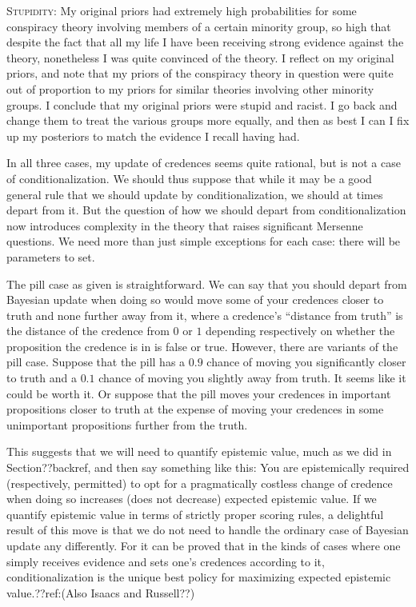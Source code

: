 \textsc{Stupidity:} My original priors had extremely high probabilities for some conspiracy theory involving members of a certain 
minority group, so high that despite the fact that all my life I have been receiving strong evidence against the theory, nonetheless I 
was quite convinced of the theory. I reflect on my original priors, and note that my priors of the conspiracy theory in question were 
quite out of proportion to my priors for similar theories involving other minority groups. I conclude that my original priors were
stupid and racist. I go back and change them to treat the various groups more equally, and then as best I can I fix up my posteriors
to match the evidence I recall having had. 

In all three cases, my update of credences seems quite rational, but is not a case of conditionalization. We should thus
suppose that while it may be a good general rule that we should update by conditionalization, we should at times depart from it.
But the question of how we should depart from conditionalization now introduces complexity in the theory that raises significant
Mersenne questions. We need more than just simple exceptions for each case: there will be parameters to set.

The pill case as given is straightforward. We can say that you should depart from Bayesian update when doing so would move
some of your credences closer to truth and none further away from it, where a credence's ``distance from truth'' is the 
distance of the credence from $0$ or $1$ depending respectively on whether the proposition the credence is in is false or
true. However, there are variants of the pill case. Suppose that the pill has a $0.9$ chance of moving you significantly
closer to truth and a $0.1$ chance of moving you slightly away from truth. It seems like it could be worth it. Or suppose
that the pill moves your credences in important propositions closer to truth at the expense of moving your credences in some
unimportant propositions further from the truth.

This suggests that we will need to quantify epistemic value, much as we did in Section??backref, and then say
something like this: You are epistemically required (respectively, permitted) to opt for a pragmatically costless change of 
credence when doing so increases (does not decrease) expected epistemic value. If we quantify epistemic value in terms of
strictly proper scoring rules, a delightful result of this move is that we do not need to handle the ordinary case of 
Bayesian update any differently. For it can be proved that in the kinds of cases where one simply receives
evidence and sets one's credences according to it, conditionalization is the unique best policy for maximizing expected
epistemic value.??ref:(Also Isaacs and Russell??) 

